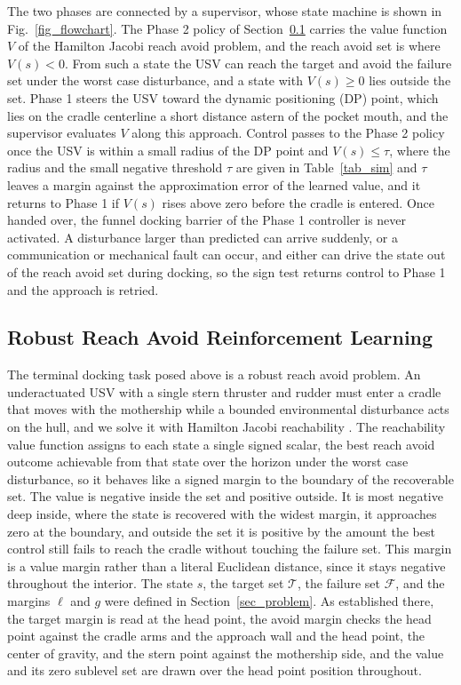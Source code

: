 \documentclass[5p,times,authoryear]{elsarticle}
\begin{document}
The two phases are connected by a supervisor, whose state machine is shown in Fig.~\ref{fig_flowchart}. The Phase 2 policy of Section~\ref{sec_rl} carries the value function $V$ of the Hamilton Jacobi reach avoid problem, and the reach avoid set is where $V(s)<0$. From such a state the USV can reach the target and avoid the failure set under the worst case disturbance, and a state with $V(s)\ge 0$ lies outside the set. Phase 1 steers the USV toward the dynamic positioning (DP) point, which lies on the cradle centerline a short distance astern of the pocket mouth, and the supervisor evaluates $V$ along this approach. Control passes to the Phase 2 policy once the USV is within a small radius of the DP point and $V(s)\le\tau$, where the radius and the small negative threshold $\tau$ are given in Table~\ref{tab_sim} and $\tau$ leaves a margin against the approximation error of the learned value, and it returns to Phase 1 if $V(s)$ rises above zero before the cradle is entered. Once handed over, the funnel docking barrier of the Phase 1 controller is never activated. A disturbance larger than predicted can arrive suddenly, or a communication or mechanical fault can occur, and either can drive the state out of the reach avoid set during docking, so the sign test returns control to Phase 1 and the approach is retried.

\subsection{Robust Reach Avoid Reinforcement Learning}\label{sec_rl}
The terminal docking task posed above is a robust reach avoid problem. An underactuated USV with a single stern thruster and rudder must enter a cradle that moves with the mothership while a bounded environmental disturbance acts on the hull, and we solve it with Hamilton Jacobi reachability \citep{mitchell2005time, bansal2017hamilton, lygeros2004reachability}. The reachability value function assigns to each state a single signed scalar, the best reach avoid outcome achievable from that state over the horizon under the worst case disturbance, so it behaves like a signed margin to the boundary of the recoverable set. The value is negative inside the set and positive outside. It is most negative deep inside, where the state is recovered with the widest margin, it approaches zero at the boundary, and outside the set it is positive by the amount the best control still fails to reach the cradle without touching the failure set. This margin is a value margin rather than a literal Euclidean distance, since it stays negative throughout the interior. The state $s$, the target set $\mathcal{T}$, the failure set $\mathcal{F}$, and the margins $\ell$ and $g$ were defined in Section~\ref{sec_problem}. As established there, the target margin is read at the head point, the avoid margin checks the head point against the cradle arms and the approach wall and the head point, the center of gravity, and the stern point against the mothership side, and the value and its zero sublevel set are drawn over the head point position throughout.
\end{document}
